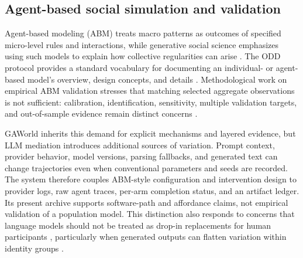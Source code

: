 \subsection{Agent-based social simulation and validation}

Agent-based modeling (ABM) treats macro patterns as outcomes of specified
micro-level rules and interactions, while generative social science emphasizes
using such models to explain how collective regularities can arise
\citep{epstein2006generative}.  The ODD protocol provides a standard vocabulary
for documenting an individual- or agent-based model's overview, design
concepts, and details \citep{grimm2006odd}.  Methodological work on empirical
ABM validation stresses that matching selected aggregate observations is not
sufficient: calibration, identification, sensitivity, multiple validation
targets, and out-of-sample evidence remain distinct concerns
\citep{windrum2007empirical,fagiolo2007critical}.

GAWorld inherits this demand for explicit mechanisms and layered evidence, but
LLM mediation introduces additional sources of variation.  Prompt context,
provider behavior, model versions, parsing fallbacks, and generated text can
change trajectories even when conventional parameters and seeds are recorded.
The system therefore couples ABM-style configuration and intervention design
to provider logs, raw agent traces, per-arm completion status, and an artifact
ledger.  Its present archive supports software-path and affordance claims, not
empirical validation of a population model.  This distinction also responds to
concerns that language models should not be treated as drop-in replacements
for human participants \citep{dillion2023replace}, particularly when generated
outputs can flatten variation within identity groups
\citep{wang2025flatten}.
